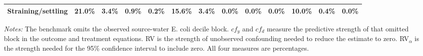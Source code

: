 \begin{landscape}
\begin{table}[p]
\begin{adjustbox}{max width=\linewidth, center}
\begin{tabular}{lcccccccccccc}
\qquad Straining/settling & 21.0\% & 3.4\% & 0.9\% & 0.2\% & 15.6\% & 3.4\% & 0.0\% & 0.0\% & 0.0\% & 10.0\% & 0.4\% & 0.0\% \\
\bottomrule
\end{tabular}
\end{adjustbox}
\par\vspace{3pt}
\begin{minipage}{\linewidth}\footnotesize \textit{Notes:} The benchmark omits the observed source-water E. coli decile block. $cf_y$ and $cf_d$ measure the predictive strength of that omitted block in the outcome and treatment equations. RV is the strength of unobserved confounding needed to reduce the estimate to zero. RV$_\alpha$ is the strength needed for the 95\% confidence interval to include zero. All four measures are percentages.\end{minipage}
\end{table}
\end{landscape}